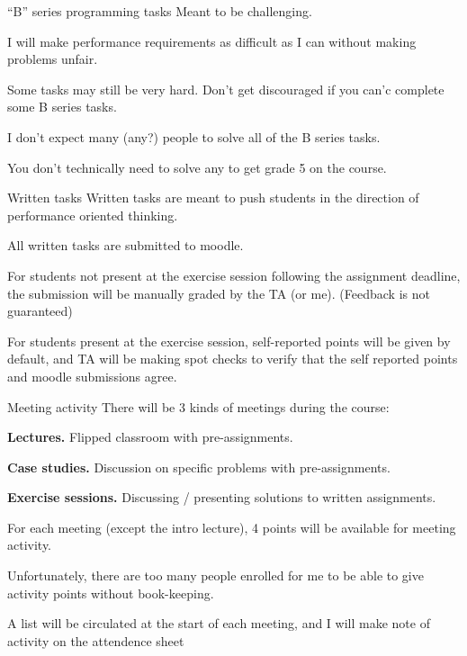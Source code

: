 \documentclass[11pt, aspectratio=169, table]{beamer}
\begin{document}
\begin{frame}{``B'' series programming tasks} 
\setlength\parskip{\fill}
Meant to be challenging.

I will make performance requirements as difficult as I can without making problems unfair.

Some tasks may still be very hard. Don't get discouraged if you can'c complete some B series tasks.

I don't expect many (any?) people to solve all of the B series tasks.

You don't technically need to solve any to get grade 5 on the course.
\end{frame}

\begin{frame}{Written tasks}
\setlength\parskip{\fill}
Written tasks are meant to push students in the direction of performance oriented thinking.

All written tasks are submitted to moodle.

For students not present at the exercise session following the assignment deadline, the submission will be 
manually graded by the TA (or me). (Feedback is not guaranteed)

For students present at the exercise session, self-reported points will be given by default, and TA will be making 
spot checks to verify that the self reported points and moodle submissions agree.
\end{frame}


\begin{frame}{Meeting activity}
There will be 3 kinds of meetings during the course:
\begin{description}
	\item{{\bf Lectures.}} Flipped classroom with pre-assignments.
	\item{{\bf Case studies.}} Discussion on specific problems with pre-assignments.
	\item{{\bf Exercise sessions.}} Discussing / presenting solutions to written assignments.
\end{description}

For each meeting (except the intro lecture), 4 points will be available for meeting activity.

Unfortunately, there are too many people enrolled for me to be able to give activity points without book-keeping.

A list will be circulated at the start of each meeting, and I will make note of activity on the attendence sheet
\end{frame}
\end{document}
